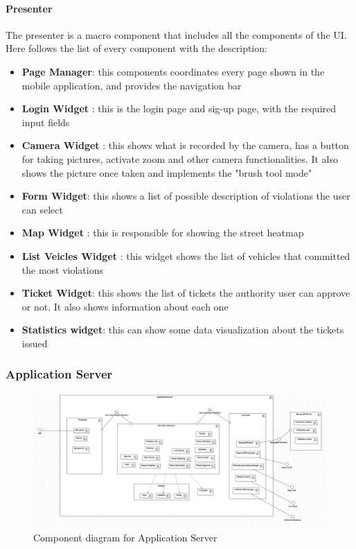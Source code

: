 \paragraph{Presenter}
The presenter is a macro component that includes all the components of the UI.
Here follows the list of every component with the description:
\begin{itemize}
  \item \textbf{Page Manager}: this components coordinates every page shown in the mobile application, and provides the navigation bar
  \item \textbf{Login Widget} : this is the login page and sig-up page, with the required input fields
  \item \textbf{Camera Widget} : this shows what is recorded by the camera, has a button for taking pictures, activate zoom and other camera functionalities. It also shows the picture once taken and implements the "brush tool mode"
  \item \textbf{Form Widget}: this shows a list of possible description of violations the user can select
  \item \textbf{Map Widget} : this is responsible for showing the street heatmap
  \item \textbf{List Veicles Widget} : this widget shows the list of vehicles that committed the most violations
  \item \textbf{Ticket Widget}: this shows the list of tickets the authority user can approve or not. It also shows information about each one
  \item \textbf{Statistics widget}: this can show some data visualization about the tickets issued
\end{itemize}



\subsubsection{Application Server} \label{API}
\begin{figure}
\centering
\includegraphics[width=\textwidth]{Images/ComponentDiagram2.png}
\caption{\label{fig:compdiag2} Component diagram for Application Server}
\end{figure}

